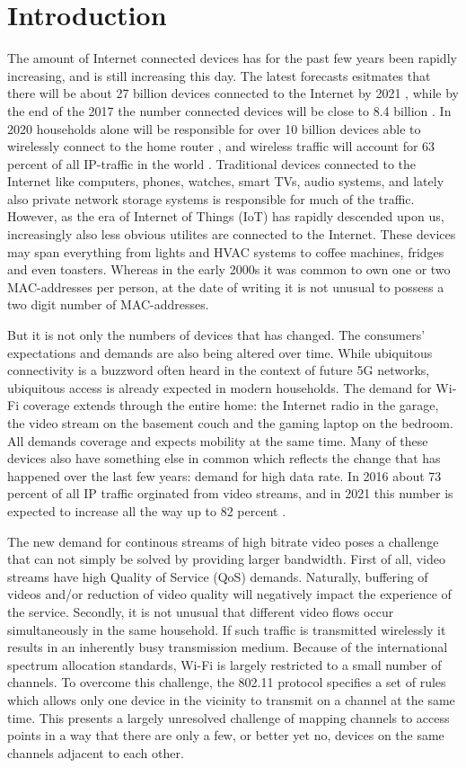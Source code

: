 \chapter{Introduction}
The amount of Internet connected devices has for the past few years been rapidly increasing, and is still increasing this day. The latest forecasts
esitmates that there will be about 27 billion devices connected to the Internet by 2021 \cite{CiscoVNI2017}, while by the end of the 2017 the number
connected devices will be close to 8.4 billion \cite{Gartner}. In 2020 households alone will be responsible for over 10 billion devices
able to wirelessly connect to the home router \cite{wifialliance}, and wireless traffic will account for 63 percent of all IP-traffic in the world \cite{CiscoVNI2017}. 
Traditional devices connected to the Internet like computers, phones, watches, smart TVs, audio systems, and lately also private network storage systems is responsible
for much of the traffic. However, as the era of Internet of Things (IoT) has rapidly descended upon us, increasingly also less obvious utilites are connected to the Internet.
These devices may span everything from lights and HVAC systems to coffee machines, fridges and even toasters. Whereas in the early 2000s it was common to own 
one or two MAC-addresses per person, at the date of writing it is not unusual to possess a two digit number of MAC-addresses.

But it is not only the numbers of devices that has changed. The consumers' expectations and demands are also being altered over time. 
While ubiquitous connectivity is a buzzword often heard in the context of future 5G networks, ubiquitous access is already expected in
modern households. The demand for Wi-Fi coverage extends through the entire home: the Internet radio in the garage, the video stream on the basement
couch and the gaming laptop on the bedroom. All demands coverage and expects mobility at the same time. Many of these devices also have something else in
common which reflects the change that has happened over the last few years: demand for high data rate. In 2016 about 73 percent of all IP traffic orginated from video
streams, and in 2021 this number is expected to increase all the way up to 82 percent \cite{CiscoVNI2017}. 

The new demand for continous streams of high bitrate video poses a challenge that can not simply be solved by providing larger bandwidth. First of all, video streams
have high Quality of Service (QoS) demands. Naturally, buffering of videos and/or reduction of video quality will negatively impact the experience of the service.
Secondly, it is not unusual that different video flows occur simultaneously in the same household. If such traffic is transmitted wirelessly
it results in an inherently busy transmission medium. Because of the international spectrum allocation standards, Wi-Fi is largely restricted to a small number of channels.
To overcome this challenge, the 802.11 protocol specifies a set of rules which allows only one device in the vicinity to transmit on a channel at the same time. 
This presents a largely unresolved challenge of mapping channels to access points in a way that there are only a few, or better yet no, devices on the same channels adjacent
to each other.

